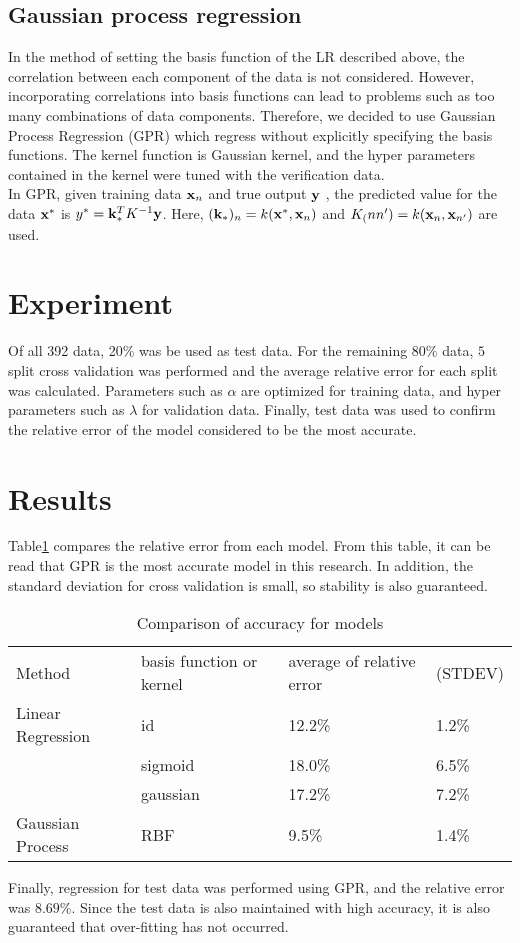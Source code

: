 \documentclass{article}
\begin{document}
\subsection{Gaussian process regression}
In the method of setting the basis function of the LR described above, the correlation between each component of the data is not considered.
However, incorporating correlations into basis functions can lead to problems such as too many combinations of data components.
Therefore, we decided to use Gaussian Process Regression (GPR) which  regress without explicitly specifying the basis functions.
The kernel function is Gaussian kernel, and the hyper parameters contained in the kernel were tuned with the verification data.\\
In GPR, given training data ${\bf x}_n$ and true output ${\bf y}$ , the predicted value for the data ${\bf x}^*$ is $y^* = {\bf k}_{*}^{T} K^{-1} {\bf y}$.
Here, $({\bf k}_{*})_n = k({\bf x}^*,{\bf x}_n)$ and $K_(n n') = k({\bf x}_n,{\bf x}_{n'})$ are used.

\section{Experiment}
Of all 392 data, 20\% was be used as test data.
For the remaining $ 80 \% $ data, $ 5 $ split cross validation was performed and the average relative error for each split was calculated.
Parameters such as $\alpha$ are optimized for training data, and hyper parameters such as $\lambda$ for validation data.
Finally, test data was used to confirm the relative error of the model considered to be the most accurate.

\section{Results}
Table\ref{model} compares the relative error from each model.
From this table, it can be read that GPR is the most accurate model in this research.
In addition, the standard deviation for cross validation is small, so stability is also guaranteed.\\
\begin{table}[htbp]
\begin{center}
\caption{Comparison of accuracy for models}
\begin{tabular}{llll}
Method & basis function or kernel & average of relative error & (STDEV)\\
Linear Regression & id & 12.2\% & 1.2\% \\
 & sigmoid &18.0\% & 6.5\% \\
 & gaussian & 17.2\% & 7.2\% \\
Gaussian Process & RBF &9.5\% & 1.4\% \\
\end{tabular}
\label{model}
\end{center}
\end{table}
Finally, regression for test data was performed using GPR, and the relative error was $ 8.69 \% $.
Since the test data is also maintained with high accuracy, it is also guaranteed that over-fitting has not occurred.
\end{document}
